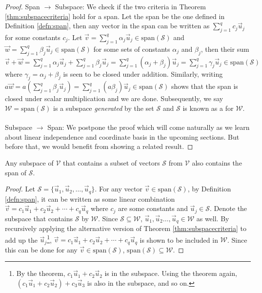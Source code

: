 \begin{proof}
Span $\rightarrow$ Subspace: We check if the two criteria in Theorem \ref{thm:subspacecriteria} hold for a span. Let the span be the one defined in Definition \ref{defn:span}, then any vector in the span can be written as $\sum_{j=1}^{q} c_j\vec{u}_j$ for some constants $c_j$. Let $\vec{v} = \sum_{j=1}^{q} \alpha_j\vec{u}_j \in \text{span}(\mathcal{S})$ and $\vec{w} = \sum_{j=1}^{q} \beta_j\vec{u}_j \in \text{span}(\mathcal{S})$ for some sets of constants $\alpha_j$ and $\beta_j$, then their sum $\vec{v} + \vec{w} = \sum_{j=1}^{q} \alpha_j\vec{u}_j + \sum_{j=1}^{q} \beta_j\vec{u}_j = \sum_{j=1}^{q} (\alpha_j + \beta_j)\vec{u}_j = \sum_{j=1}^{q} \gamma_j\vec{u}_j \in \text{span}(\mathcal{S})$ where $\gamma_j = \alpha_j + \beta_j$ is seen to be closed under addition. Similarly, writing $a\vec{w} = a(\sum_{j=1}^{q} \beta_j\vec{u}_j) = \sum_{j=1}^{q} (a\beta_j)\vec{u}_j \in \text{span}(\mathcal{S})$ shows that the span is closed under scalar multiplication and we are done. Subsequently, we say $\mathcal{W} = \text{span}(\mathcal{S})$ is a subspace \textit{generated} by the set $\mathcal{S}$ and $\mathcal{S}$ is known as a  for $\mathcal{W}$. \\
\\
Subspace $\rightarrow$ Span: We postpone the proof which will come naturally as we learn about linear independence and coordinate basis in the upcoming sections. But before that, we would benefit from showing a related result.
\end{proof}
\begin{proper}
\label{proper:WcontainsspanS}
Any subspace of $\mathcal{V}$ that contains a subset of vectors $\mathcal{S}$ from $\mathcal{V}$ also contains the span of $\mathcal{S}$.
\end{proper}
\begin{proof}
Let $\mathcal{S} = \{\vec{u}_1, \vec{u}_2, \ldots, \vec{u}_q\}$. For any vector $\vec{v} \in \text{span}(\mathcal{S})$, by Definition \ref{defn:span}, it can be written as some linear combination $\vec{v} = c_1\vec{u}_1 + c_2\vec{u}_2 + \cdots + c_q\vec{u}_q$ where $c_j$ are some constants and $\vec{u}_j \in \mathcal{S}$. Denote the subspace that contains $\mathcal{S}$ by $\mathcal{W}$. Since $\mathcal{S} \subseteq \mathcal{W}$, $\vec{u}_1, \vec{u}_2 \ldots, \vec{u}_q \in \mathcal{W}$ as well. By recursively applying the alternative version of Theorem \ref{thm:subspacecriteria} to add up the $\vec{u}_j$\footnote{By the theorem, $c_1\vec{u}_1 + c_2\vec{u}_2$ is in the subspace. Using the theorem again, $(c_1\vec{u}_1 + c_2\vec{u}_2) + c_3\vec{u}_3$ is also in the subspace, and so on.}, $\vec{v} = c_1\vec{u}_1 + c_2\vec{u}_2 + \cdots + c_q\vec{u}_q$ is shown to be included in $\mathcal{W}$. Since this can be done for any $\vec{v} \in \text{span}(\mathcal{S})$, $\text{span}(\mathcal{S}) \subseteq \mathcal{W}$.
\end{proof}

